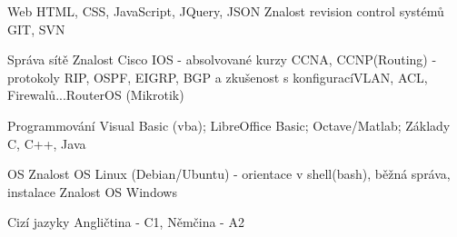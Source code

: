 

\begin{cvskills}

  
  \vspace{5pt}
  \cvskill
    {Web} %
    {HTML, CSS, JavaScript, JQuery, JSON \newline Znalost revision control systémů GIT, SVN}

  \vspace{5pt}
    
  \cvskill
    {Správa sítě} %
    {Znalost Cisco IOS - absolvované kurzy CCNA, CCNP(Routing) - protokoly RIP, OSPF, EIGRP, BGP a zkušenost s konfigurací\newline VLAN, ACL, Firewalů...\newline RouterOS (Mikrotik)} %
  \vspace{5pt}
  
  \cvskill
    {Programmování} %
    {Visual Basic (vba); LibreOffice Basic; Octave/Matlab; Základy C, C++, Java} %

  \vspace{5pt}
  \cvskill
    {OS}
    {Znalost OS Linux (Debian/Ubuntu) - orientace v shell(bash), běžná správa, instalace \newline Znalost OS Windows}
  \vspace{5pt}
    
  \cvskill
    {Cizí jazyky} %
    {Angličtina - C1, Němčina - A2} %

\end{cvskills}
